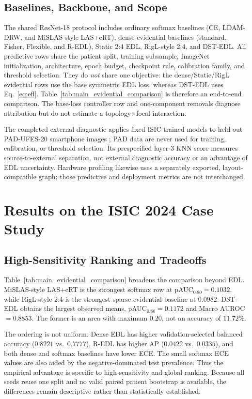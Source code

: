 \documentclass[letterpaper]{article}
\begin{document}
\subsection{Baselines, Backbone, and Scope}
The shared ResNet-18 protocol includes ordinary softmax baselines (CE, LDAM-DRW, and MiSLAS-style LAS+cRT), dense evidential baselines (standard, Fisher, Flexible, and R-EDL), Static 2:4 EDL, RigL-style 2:4, and DST-EDL. All predictive rows share the patient split, training subsample, ImageNet initialization, architecture, epoch budget, checkpoint rule, calibration family, and threshold selection. They do \emph{not} share one objective: the dense/Static/RigL evidential rows use the base symmetric EDL loss, whereas DST-EDL uses Eq.~\ref{eq:efl}. Table~\ref{tab:main_evidential_comparison} is therefore an end-to-end comparison. The base-loss controller row and one-component removals diagnose attribution but do not estimate a topology$\times$focal interaction.

The completed external diagnostic applies fixed ISIC-trained models to held-out PAD-UFES-20 smartphone images \cite{pacheco2020padufes}; PAD data are never used for training, calibration, or threshold selection. Its prespecified layer-3 KNN score measures source-to-external separation, not external diagnostic accuracy or an advantage of EDL uncertainty. Hardware profiling likewise uses a separately exported, layout-compatible graph; those predictive and deployment metrics are not interchanged.

\section{Results on the ISIC 2024 Case Study}\label{sec:results}

\subsection{High-Sensitivity Ranking and Tradeoffs}
Table~\ref{tab:main_evidential_comparison} broadens the comparison beyond EDL. MiSLAS-style LAS+cRT is the strongest softmax row at pAUC$_{0.80}=0.1032$, while RigL-style 2:4 is the strongest sparse evidential baseline at $0.0982$. DST-EDL obtains the largest observed means, pAUC$_{0.80}=0.1172$ and Macro AUROC $=0.8853$. The former is an area with maximum $0.20$, not an accuracy of $11.72\%$.

The ordering is not uniform. Dense EDL has higher validation-selected balanced accuracy ($0.8221$ vs.~$0.7777$), R-EDL has higher AP ($0.0422$ vs.~$0.0335$), and both dense and softmax baselines have lower ECE. The small softmax ECE values are also aided by the negative-dominated test prevalence. Thus the empirical advantage is specific to high-sensitivity and global ranking. Because all seeds reuse one split and no valid paired patient bootstrap is available, the differences remain descriptive rather than statistically established.
\end{document}

